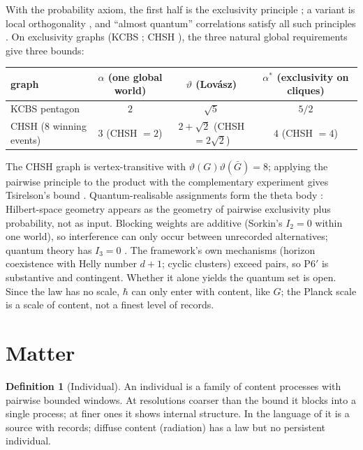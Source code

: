 \documentclass[11pt]{article}
\theoremstyle{definition}
\newtheorem{definition}[theorem]{Definition}
\theoremstyle{remark}
\begin{document}
With the probability axiom, the first half is the exclusivity principle \cite{cabello13,csw}; a variant is local orthogonality \cite{fritz}, and ``almost quantum'' correlations satisfy all such principles \cite{navascues}. On exclusivity graphs (KCBS \cite{kcbs}; CHSH \cite{chsh}), the three natural global requirements give three bounds:
\begin{center}\small
\begin{tabular}{lccc}\toprule
graph & $\alpha$ (one global world) & $\vartheta$ (Lov\'asz) & $\alpha^*$ (exclusivity on cliques)\\\midrule
KCBS pentagon & $2$ & $\sqrt5$ & $5/2$\\
CHSH (8 winning events) & $3$ (CHSH $=2$) & $2+\sqrt2$ (CHSH $=2\sqrt2$) & $4$ (CHSH $=4$)\\\bottomrule
\end{tabular}
\end{center}
The CHSH graph is vertex-transitive with $\vartheta(G)\vartheta(\bar G)=8$; applying the pairwise principle to the product with the complementary experiment gives Tsirelson's bound \cite{cabello13}. Quantum-realisable assignments form the theta body \cite{csw}: Hilbert-space geometry appears as the geometry of pairwise exclusivity plus probability, not as input. Blocking weights are additive (Sorkin's $I_2=0$ within one world), so interference can only occur between unrecorded alternatives; quantum theory has $I_3=0$ \cite{sorkin94}. The framework's own mechanisms (horizon coexistence with Helly number $d+1$; cyclic clusters) exceed pairs, so P6$'$ is substantive and contingent. Whether it alone yields the quantum set is open. Since the law has no scale, $\hbar$ can only enter with content, like $G$; the Planck scale is a scale of content, not a finest level of records.

\section{Matter}\label{sec:matter}

\begin{definition}[Individual]
An individual is a family of content processes with pairwise bounded windows. At resolutions coarser than the bound it blocks into a single process; at finer ones it shows internal structure. In the language of \cite{pzfc} it is a source with records; diffuse content (radiation) has a law but no persistent individual.
\end{definition}
\end{document}
